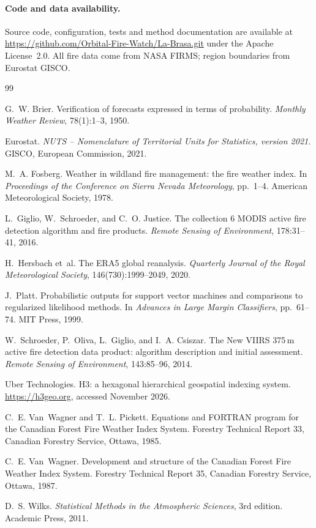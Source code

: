 \documentclass[11pt,a4paper]{article}
\begin{document}
\paragraph{Code and data availability.}
Source code, configuration, tests and method documentation are available at \url{https://github.com/Orbital-Fire-Watch/La-Brasa.git} under the
Apache License~2.0. All fire data come from NASA FIRMS; region boundaries from Eurostat GISCO.

\begin{thebibliography}{99}\small

G.~W. Brier.
\newblock Verification of forecasts expressed in terms of probability.
\newblock \emph{Monthly Weather Review}, 78(1):1--3, 1950.

Eurostat.
\newblock \emph{NUTS -- Nomenclature of Territorial Units for Statistics, version 2021}.
\newblock GISCO, European Commission, 2021.

M.~A. Fosberg.
\newblock Weather in wildland fire management: the fire weather index.
\newblock In \emph{Proceedings of the Conference on Sierra Nevada Meteorology}, pp.~1--4. American
Meteorological Society, 1978.

L.~Giglio, W.~Schroeder, and C.~O. Justice.
\newblock The collection 6 MODIS active fire detection algorithm and fire products.
\newblock \emph{Remote Sensing of Environment}, 178:31--41, 2016.

H.~Hersbach et~al.
\newblock The ERA5 global reanalysis.
\newblock \emph{Quarterly Journal of the Royal Meteorological Society}, 146(730):1999--2049, 2020.

J.~Platt.
\newblock Probabilistic outputs for support vector machines and comparisons to regularized likelihood
methods.
\newblock In \emph{Advances in Large Margin Classifiers}, pp.~61--74. MIT Press, 1999.

W.~Schroeder, P.~Oliva, L.~Giglio, and I.~A. Csiszar.
\newblock The New VIIRS 375\,m active fire detection data product: algorithm description and initial
assessment.
\newblock \emph{Remote Sensing of Environment}, 143:85--96, 2014.

Uber Technologies.
\newblock H3: a hexagonal hierarchical geospatial indexing system.
\newblock \url{https://h3geo.org}, accessed November 2026.

C.~E. Van~Wagner and T.~L. Pickett.
\newblock Equations and FORTRAN program for the Canadian Forest Fire Weather Index System.
\newblock Forestry Technical Report 33, Canadian Forestry Service, Ottawa, 1985.

C.~E. Van~Wagner.
\newblock Development and structure of the Canadian Forest Fire Weather Index System.
\newblock Forestry Technical Report 35, Canadian Forestry Service, Ottawa, 1987.

D.~S. Wilks.
\newblock \emph{Statistical Methods in the Atmospheric Sciences}, 3rd edition.
\newblock Academic Press, 2011.

\end{thebibliography}
\end{document}
